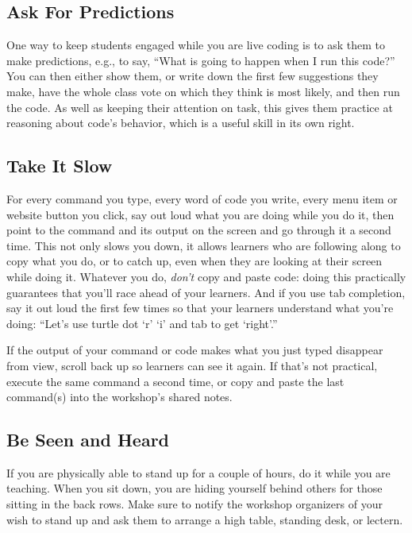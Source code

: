 \subsection*{Ask For Predictions}

One way to keep students engaged while you are live coding is to ask
them to make predictions, e.g., to say, ``What is going to happen when I
run this code?'' You can then either show them, or write down the first
few suggestions they make, have the whole class vote on which they think
is most likely, and then run the code. As well as keeping their
attention on task, this gives them practice at reasoning about code's
behavior, which is a useful skill in its own right.

\subsection*{Take It Slow}

For every command you type, every word of code you write, every menu
item or website button you click, say out loud what you are doing while
you do it, then point to the command and its output on the screen and go
through it a second time. This not only slows you down, it allows
learners who are following along to copy what you do, or to catch up,
even when they are looking at their screen while doing it. Whatever you
do, \emph{don't} copy and paste code: doing this practically guarantees that
you'll race ahead of your learners. And if you use tab completion, say
it out loud the first few times so that your learners understand what
you're doing: ``Let's use turtle dot `r' `i' and tab to get `right'.''

If the output of your command or code makes what you just typed
disappear from view, scroll back up so learners can see it again. If
that's not practical, execute the same command a second time, or copy
and paste the last command(s) into the workshop's shared notes.

\subsection*{Be Seen and Heard}

If you are physically able to stand up for a couple of hours, do it
while you are teaching. When you sit down, you are hiding yourself
behind others for those sitting in the back rows. Make sure to notify
the workshop organizers of your wish to stand up and ask them to arrange
a high table, standing desk, or lectern.

